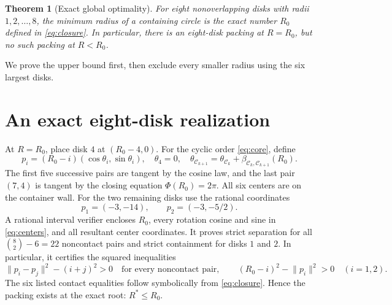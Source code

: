 \documentclass[10pt,a4paper]{article}
\newtheorem{theorem}{Theorem}[section]
\newcommand{\Rcrit}{R_0}
\newcommand{\dist}[1]{\lVert #1\rVert}
\begin{document}
\begin{theorem}[Exact global optimality]\label{thm:main}
For eight nonoverlapping disks with radii $1,2,\ldots,8$, the minimum radius of a containing circle is the exact number $\Rcrit$ defined in \eqref{eq:closure}. In particular, there is an eight-disk packing at $R=\Rcrit$, but no such packing at $R<\Rcrit$.
\end{theorem}
We prove the upper bound first, then exclude every smaller radius using the six largest disks.

\section{An exact eight-disk realization}\label{sec:upper}
At $R=\Rcrit$, place disk $4$ at $(\Rcrit-4,0)$. For the cyclic order \eqref{eq:core}, define
\begin{equation}\label{eq:centers}
 p_i=(\Rcrit-i)(\cos\theta_i,\sin\theta_i),\quad
 \theta_4=0,\quad
 \theta_{\mathcal C_{k+1}}=\theta_{\mathcal C_k}+\beta_{\mathcal C_k,\mathcal C_{k+1}}(\Rcrit).
\end{equation}
The first five successive pairs are tangent by the cosine law, and the last pair $(7,4)$ is tangent by the closing equation $\Phi(\Rcrit)=2\pi$. All six centers are on the container wall. For the two remaining disks use the rational coordinates
\begin{equation}\label{eq:small}
 \boxed{p_1=(-3,-14),\qquad p_2=(-3,-5/2).}
\end{equation}
A rational interval verifier encloses $\Rcrit$, every rotation cosine and sine in \eqref{eq:centers}, and all resultant center coordinates. It proves strict separation for all $\binom82-6=22$ noncontact pairs and strict containment for disks $1$ and $2$. In particular, it certifies the squared inequalities
\[
 \dist{p_i-p_j}^2-(i+j)^2>0 \quad\text{for every noncontact pair},
 \qquad (\Rcrit-i)^2-\dist{p_i}^2>0 \quad (i=1,2).
\]
The six listed contact equalities follow symbolically from \eqref{eq:closure}. Hence the packing exists at the exact root: $R^*\le\Rcrit$.
\end{document}
